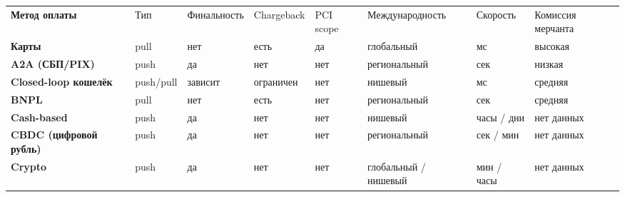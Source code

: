 \begingroup
\scriptsize
\renewcommand{\arraystretch}{1.16}
\setlength{\tabcolsep}{2pt}

\begin{tabularx}{\textwidth}{
    >{\raggedright\arraybackslash\bfseries}p{}
    >{\raggedright\arraybackslash}p{}
    >{\raggedright\arraybackslash}p{}
    >{\raggedright\arraybackslash}p{}
    >{\raggedright\arraybackslash}p{}
    >{\raggedright\arraybackslash}p{}
    >{\raggedright\arraybackslash}p{}
    >{\raggedright\arraybackslash}p{}
  }
  \rowcolor{Panel}
  Метод оплаты               & Тип & Финальность & Chargeback & PCI
  scope & Международность & Скорость & Комиссия мерчанта \\

  Карты                      &
  \cellcolor{Bad!10}pull     &
  \cellcolor{Bad!10}нет      &
  \cellcolor{Bad!10}есть     &
  \cellcolor{Bad!10}да       &
  \cellcolor{Good!14}глобальный &
  \cellcolor{Good!14}мс      &
  \cellcolor{Bad!10}высокая
  \\

  A2A (СБП/PIX)              &
  \cellcolor{Good!14}push    &
  \cellcolor{Good!14}да      &
  \cellcolor{Good!14}нет     &
  \cellcolor{Good!14}нет     &
  \cellcolor{Ink!6}региональный &
  \cellcolor{Good!14}сек     &
  \cellcolor{Good!14}низкая
  \\

  Closed-loop кошелёк        &
  \cellcolor{Ink!6}push/pull &
  \cellcolor{Ink!6}зависит   &
  \cellcolor{Ink!6}ограничен &
  \cellcolor{Good!14}нет     &
  \cellcolor{Bad!10}нишевый  &
  \cellcolor{Good!14}мс      &
  \cellcolor{Ink!6}средняя
  \\

  BNPL                       &
  \cellcolor{Bad!10}pull     &
  \cellcolor{Bad!10}нет      &
  \cellcolor{Bad!10}есть     &
  \cellcolor{Ink!6}нет       &
  \cellcolor{Ink!6}региональный &
  \cellcolor{Good!14}сек     &
  \cellcolor{Ink!6}средняя
  \\

  Cash-based                 &
  \cellcolor{Good!14}push    &
  \cellcolor{Good!14}да      &
  \cellcolor{Good!14}нет     &
  \cellcolor{Good!14}нет     &
  \cellcolor{Bad!10}нишевый  &
  \cellcolor{Bad!10}часы / дни &
  \cellcolor{Ink!6}нет данных
  \\

  CBDC (цифровой рубль)      &
  \cellcolor{Good!14}push    &
  \cellcolor{Good!14}да      &
  \cellcolor{Good!14}нет     &
  \cellcolor{Good!14}нет     &
  \cellcolor{Bad!10}региональный &
  \cellcolor{Ink!6}сек / мин &
  \cellcolor{Ink!6}нет данных
  \\

  Crypto                     &
  \cellcolor{Good!14}push    &
  \cellcolor{Good!14}да      &
  \cellcolor{Good!14}нет     &
  \cellcolor{Good!14}нет     &
  \cellcolor{Ink!6}глобальный / нишевый &
  \cellcolor{Ink!6}мин / часы &
  \cellcolor{Ink!6}нет данных
  \\[0.45ex]
\end{tabularx}

